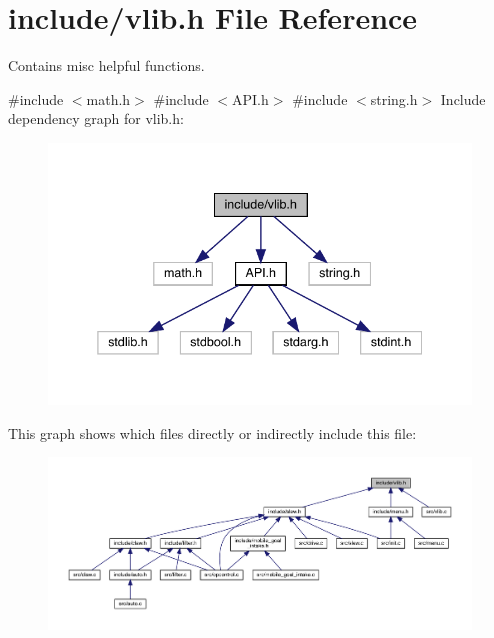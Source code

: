 \section{include/vlib.h File Reference}
\label{vlib_8h}


Contains misc helpful functions.  


{\ttfamily \#include $<$math.\+h$>$}\newline
{\ttfamily \#include $<$A\+P\+I.\+h$>$}\newline
{\ttfamily \#include $<$string.\+h$>$}\newline
Include dependency graph for vlib.\+h\+:\nopagebreak
\begin{figure}[H]
\begin{center}
\leavevmode
\includegraphics[width=338pt]{vlib_8h__incl}
\end{center}
\end{figure}
This graph shows which files directly or indirectly include this file\+:\nopagebreak
\begin{figure}[H]
\begin{center}
\leavevmode
\includegraphics[width=350pt]{vlib_8h__dep__incl}
\end{center}
\end{figure}
